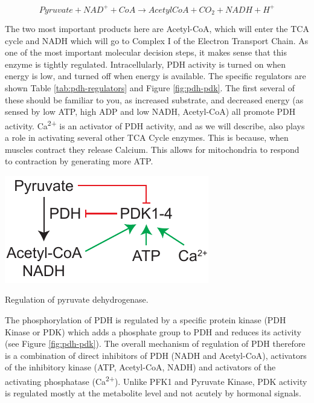 \documentclass{tufte-handout}
\begin{document}
\begin{equation}
Pyruvate + NAD^+ + CoA \rightarrow AcetylCoA + CO_2 + NADH +H^+
\end{equation}

The two most important products here are Acetyl-CoA, which will enter the TCA cycle and NADH which will go to Complex I of the Electron Transport Chain.  As one of the most important molecular decision steps, it makes sense that this enzyme is tightly regulated.  Intracellularly, PDH activity is turned on when energy is low, and turned off when energy is available.  The specific regulators are shown Table \ref{tab:pdh-regulators} and Figure \ref{fig:pdh-pdk}.  The first several of these should be familiar to you, as increased substrate, and decreased energy (as sensed by low ATP, high ADP and low NADH, Acetyl-CoA) all promote PDH activity.  Ca\textsuperscript{2+} is an activator of PDH activity, and as we will describe, also plays a role in activating several other TCA Cycle enzymes.  This is because, when muscles contract they release Calcium.  This allows for mitochondria to respond to contraction by generating more ATP.

\begin{marginfigure}
\includegraphics{figures/pdk-regulation.pdf}
\caption{Regulation of pyruvate dehydrogenase.}
\label{fig:pdh-pdk}
\end{marginfigure}

  The phosphorylation of PDH is regulated by a specific protein kinase (PDH Kinase or PDK) which adds a phosphate group to PDH and reduces its activity (see Figure \ref{fig:pdh-pdk}).  The overall mechanism of regulation of PDH therefore is a combination of direct inhibitors of PDH (NADH and Acetyl-CoA), activators of the inhibitory kinase (ATP, Acetyl-CoA, NADH) and activators of the activating phosphatase (Ca\textsuperscript{2+}).  Unlike PFK1 and Pyruvate Kinase, PDK activity is regulated mostly at the metabolite level and not acutely by hormonal signals. 
\end{document}
